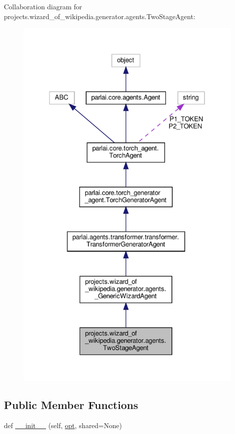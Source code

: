 Collaboration diagram for projects.\+wizard\+\_\+of\+\_\+wikipedia.\+generator.\+agents.\+Two\+Stage\+Agent\+:
\nopagebreak
\begin{figure}[H]
\begin{center}
\leavevmode
\includegraphics[width=318pt]{classprojects_1_1wizard__of__wikipedia_1_1generator_1_1agents_1_1TwoStageAgent__coll__graph}
\end{center}
\end{figure}
\subsection*{Public Member Functions}
\begin{DoxyCompactItemize}
\item 
def \hyperlink{classprojects_1_1wizard__of__wikipedia_1_1generator_1_1agents_1_1TwoStageAgent_a5aae49d192aac40f8fde1b1c42409261}{\+\_\+\+\_\+init\+\_\+\+\_\+} (self, \hyperlink{classparlai_1_1core_1_1torch__agent_1_1TorchAgent_a785bb920cf8c8afc3e9bf6a8b77e335a}{opt}, shared=None)
\end{DoxyCompactItemize}
